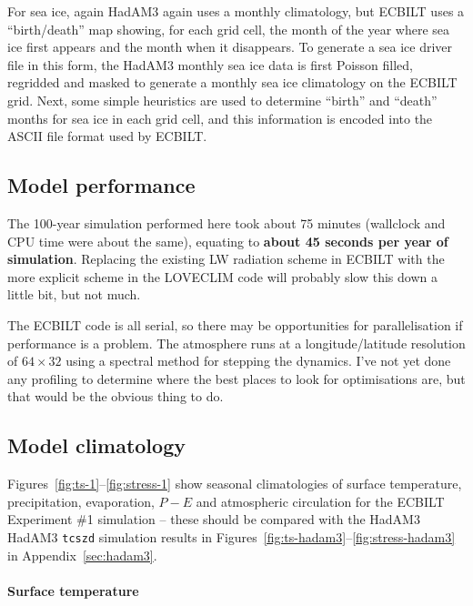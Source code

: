\documentclass[a4paper,11pt]{article}
\begin{document}
For sea ice, again HadAM3 again uses a monthly climatology, but ECBILT
uses a ``birth/death'' map showing, for each grid cell, the month of
the year where sea ice first appears and the month when it disappears.
To generate a sea ice driver file in this form, the HadAM3 monthly sea
ice data is first Poisson filled, regridded and masked to generate a
monthly sea ice climatology on the ECBILT grid.  Next, some simple
heuristics are used to determine ``birth'' and ``death'' months for
sea ice in each grid cell, and this information is encoded into the
ASCII file format used by ECBILT.

\subsection{Model performance}

The 100-year simulation performed here took about 75 minutes
(wallclock and CPU time were about the same), equating to
\textbf{about 45 seconds per year of simulation}.  Replacing the
existing LW radiation scheme in ECBILT with the more explicit scheme
in the LOVECLIM code will probably slow this down a little bit, but
not much.

The ECBILT code is all serial, so there may be opportunities for
parallelisation if performance is a problem.  The atmosphere runs at a
longitude/latitude resolution of $64 \times 32$ using a spectral
method for stepping the dynamics.  I've not yet done any profiling to
determine where the best places to look for optimisations are, but
that would be the obvious thing to do.

\subsection{Model climatology}

Figures~\ref{fig:ts-1}--\ref{fig:stress-1} show seasonal climatologies
of surface temperature, precipitation, evaporation, $P-E$ and
atmospheric circulation for the ECBILT Experiment \#1 simulation --
these should be compared with the HadAM3 HadAM3 \texttt{tcszd}
simulation results in
Figures~\ref{fig:ts-hadam3}--\ref{fig:stress-hadam3} in
Appendix~\ref{sec:hadam3}.

\paragraph{Surface temperature}
\end{document}
